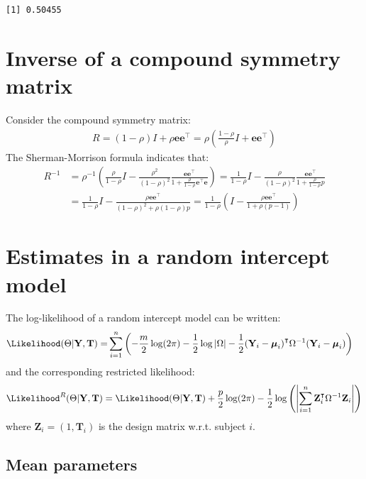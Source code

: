 \documentclass[12pt]{article}
\newcommand\Ve{\mathbf{e}}
\newcommand\VT{\mathbf{T}}
\newcommand\VY{\mathbf{Y}}
\newcommand\VZ{\mathbf{Z}}
\newcommand\Vmu{\boldsymbol{\mu}}
\newcommand\trans[1]{{#1}^\intercal}%
\begin{document}
\begin{verbatim}
[1] 0.50455
\end{verbatim}


\clearpage

\appendix

\section{Inverse of a compound symmetry matrix}
\label{sm:invCS}
Consider the compound symmetry matrix:
\begin{align*}
R= (1-\rho) I + \rho \Ve\trans{\Ve}= \rho\left(\frac{1-\rho}{\rho} I + \Ve\trans{\Ve}\right) 
\end{align*}
The Sherman-Morrison formula indicates that:
\begin{align*}
R^{-1} &= \rho^{-1} \left(\frac{\rho}{1-\rho} I - \frac{\rho^2}{(1-\rho)^2}\frac{\Ve\trans{\Ve}}{1+\frac{\rho}{1-\rho}\trans{\Ve}\Ve}\right) = \frac{1}{1-\rho} I - \frac{\rho}{(1-\rho)^2}\frac{\Ve\trans{\Ve}}{1+\frac{\rho}{1-\rho}p} \\
&=  \frac{1}{1-\rho} I - \frac{\rho \Ve\trans{\Ve}}{(1-\rho)^2+\rho(1-\rho)p} =  \frac{1}{1-\rho} \left(I - \frac{\rho \Ve\trans{\Ve}}{1+\rho(p-1)}\right)
\end{align*}

\section{Estimates in a random intercept model}
\label{sm:rhoML}
The log-likelihood of a random intercept model can be written:
\begin{align*}
\Likelihood(\Theta|\VY,\VT) =& \sum_{i=1}^{n} \left(-\frac{m}{2} \log(2\pi) - \frac{1}{2} \log\left|\Omega\right| - \frac{1}{2} \trans{(\VY_i-\Vmu_i)} \Omega^{-1} (\VY_i-\Vmu_i) \right)
\end{align*}
and the corresponding restricted likelihood:
\begin{align*}
\Likelihood^R(\Theta|\VY,\VT) = \Likelihood(\Theta|\VY,\VT) + \frac{p}{2} \log(2\pi)-\frac{1}{2} \log\left(\left|\sum_{i=1}^n \trans{\VZ}_i \Omega^{-1} \VZ_i \right|\right)
\end{align*}
where \(\VZ_i = (1,\VT_i)\) is the design matrix w.r.t. subject \(i\).


\subsection{Mean parameters}
\label{sec:org2c7542e}
\end{document}
